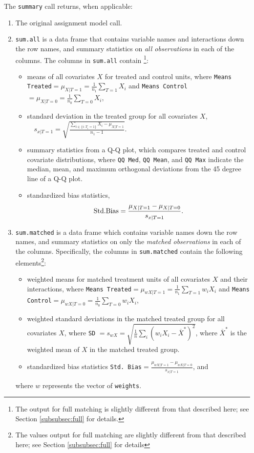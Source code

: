 \documentclass[oneside,letterpaper,titlepage]{article}
\begin{document}
The \texttt{summary} call returns, when applicable:

\begin{enumerate}
\item The original assignment model call.
\item \texttt{sum.all} is a data frame that contains variable names
  and interactions down the row names, and summary statistics on
  \emph{all observations} in each of the columns.  The columns in
  \texttt{sum.all} contain \footnote{The output for full matching is
    slightly different from that described here; see Section
    \ref{subsubsec:full} for details.}:
  \begin{itemize}
  \item means of all covariates $X$ for treated and control units,
    where \texttt{Means Treated}$= \mu_{X|T=1} = \frac{1}{n_1}
    \sum_{T=1} X_i$ and \texttt{Means Control}$= \mu_{X|T=0} =
    \frac{1}{n_0} \sum_{T=0} X_i$,
  \item standard deviation in the treated group for all covariates $X$,  
	$\quad s_{x|T=1} = \sqrt{\frac{\sum_{i \in \{i: T_i=1\}}
        X_i - \mu_{X|T=1}}{n_1-1} }.$
  \item summary statistics from a Q-Q plot, which compares treated and
    control covariate distributions, where \texttt{QQ Med}, \texttt{QQ
      Mean}, and \texttt{QQ Max} indicate the median, mean, and
    maximum orthogonal deviations from the 45 degree line of a Q-Q
    plot.
  \item standardized bias statistics, $${\rm Std.
      Bias}=\frac{\mu_{X|T=1} - \mu_{X|T=0}}{s_{x|T=1}}.$$
  \end{itemize}
  
\item \texttt{sum.matched} is a data frame which contains variable
  names down the row names, and summary statistics on only the
  \emph{matched observations} in each of the columns.  Specifically,
  the columns in \texttt{sum.matched} contain the following
  elements\footnote{The values output for full matching are slightly
    different from that described here; see Section \ref{subsubsec:full}
    for details}:
  \begin{itemize}
  \item weighted means for matched treatment units of all covariates
    $X$ and their interactions, where \texttt{Means Treated}$=
    \mu_{wX|T=1} = \frac{1}{n_1} \sum_{T=1} w_iX_i$ and \texttt{Means
      Control}$=\mu_{wX|T=0} = \frac{1}{n_0} \sum_{T=0} w_iX_i$,
  \item weighted standard deviations in the matched treated group 
   for all covariates $X$, where \texttt{SD} $= 
    s_{wX} =
    \sqrt{\frac{1}{n} \sum_{i} (w_iX_i - \overline{X}^*)^2}$, where
    $\overline{X}^*$ is the weighted mean of $X$ in the matched treated group.
  \item standardized bias statistics \texttt{Std.
      Bias}$=\frac{\mu_{wX|T=1} - \mu_{wX|T=0}}{s_{x|T=1}}$, and
  \end{itemize}
  where $w$ represents the vector of \texttt{weights}.
  

\end{enumerate}
\end{document}
